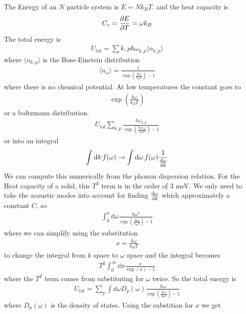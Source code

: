 \documentclass[../main.tex]{subfiles}
\begin{document}
The Energy of an $N$ particle system is $E = N k_B T$. and the heat capacity is
\begin{align*}
    C_v = \pdv{E}{T} = \omega k_B
\end{align*}
The total energy is
\begin{align*}
    U_{tot} = \sum{k, p} \hbar \omega_{k,p} \langle n_{k,p} \rangle
\end{align*}
where $\langle n_{k,p} \rangle$ is the Bose-Einstein distribution
\begin{align*}
    \langle n_\omega \rangle = \frac{1}{\exp(\frac{\hbar \omega}{k_B T}) - 1}
\end{align*}
where there is no chemical potential. At low temperatures the constant goes to
\begin{align*}
    \exp(\frac{\hbar \omega}{k_B T})
\end{align*}
or a boltzmann distribution.
\begin{align*}
    U_{tot} \sum_{k,p} \frac{\hbar \omega_{k,p}}{\exp(\frac{\hbar \omega_{k,p}}{k_B T}) - 1}
\end{align*}
or into an integral
\begin{align*}
    \int \dd{k} f(\omega)  \to \int \dd{\omega} f(\omega) \frac{1}{\dv{\omega}{k}}
\end{align*}
We can compute this numerically from the phonon dispersion relation. For the Heat capacity of a
solid, this $T^3$ term is in the order of 3 meV. We only need to take the acoustic modes into 
account for finding $\dv{\omega}{k}$ which approximately a constant $C$, so
\begin{align*}
    \int_0^{a} \dd{\omega} \frac{\hbar\omega^2}{\exp(\frac{\hbar \omega}{k_B T}) - 1}
\end{align*}
where we can simplify using the substitution 
\begin{align*}
    x = \frac{\hbar \omega }{k_B T}
\end{align*}
to change the integral from $k$ space to $\omega$ space and the integral becomes
\begin{align*}
    T^2 \int_0^\infty \dd{x} \frac{x}{\exp(x) - 1}
\end{align*}
where the $T^2$ term comes from substituting for $\omega$ twice. So the total energy is
\begin{align*}
    U_{tot} = \sum_{p} \int \dd{\omega} D_p(\omega) \frac{\hbar \omega}{\exp(\frac{\hbar \omega}{k_B T}) - 1}
\end{align*}
where $D_p(\omega)$ is the density of states. Using the substition for $x$ we get
\end{document}
